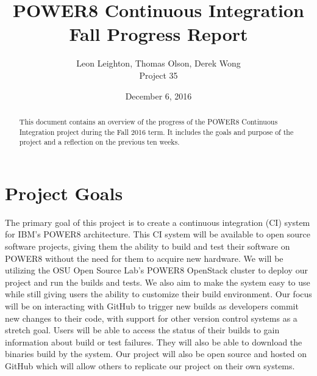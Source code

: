 \documentclass[10pt,onecolumn,journal,draftclsnofoot]{IEEEtran}
\begin{document}
\begin{titlepage}
  \title{POWER8 Continuous Integration\\ Fall Progress Report}
  \author{Leon Leighton, Thomas Olson, Derek Wong\\Project 35}
  \date{December 6, 2016}
  \maketitle
  \vspace{4cm}
  \begin{abstract}
  \noindent This document contains an overview of the progress of the POWER8 Continuous Integration project during the Fall 2016 term.
    It includes the goals and purpose of the project and a reflection on the previous ten weeks.
 \end{abstract}
\end{titlepage}

\tableofcontents
\clearpage

\section{Project Goals}
The primary goal of this project is to create a continuous integration (CI) system for IBM's POWER8 architecture.
This CI system will be available to open source software projects, giving them the ability to build and test their software on POWER8 without the need for them to acquire new hardware.
We will be utilizing the OSU Open Source Lab's POWER8 OpenStack cluster to deploy our project and run the builds and tests.
We also aim to make the system easy to use while still giving users the ability to customize their build environment.
Our focus will be on interacting with GitHub to trigger new builds as developers commit new changes to their code, with support for other version control systems as a stretch goal.
Users will be able to access the status of their builds to gain information about build or test failures.
They will also be able to download the binaries build by the system.
Our project will also be open source and hosted on GitHub which will allow others to replicate our project on their own systems.
\end{document}
